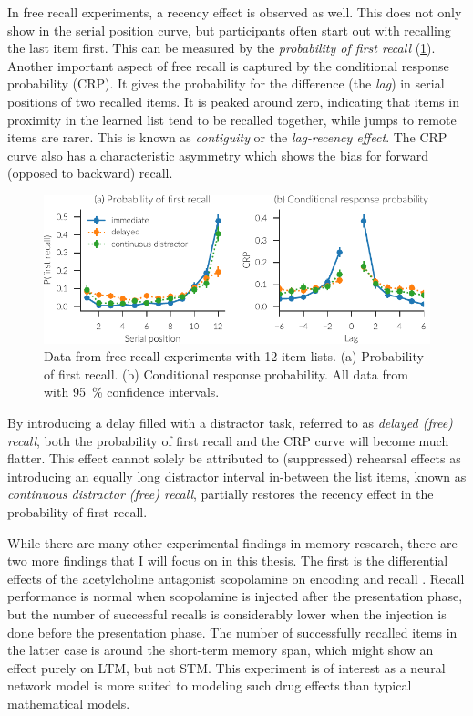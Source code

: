 In free recall experiments, a recency effect is observed as well.
This does not only show in the serial position curve, but participants often start out with recalling the last item first.
This can be measured by the \emph{probability of first recall} (\cref{fig:exp-free-recall}).
Another important aspect of free recall is captured by the conditional response probability (CRP).
It gives the probability for the difference (the \emph{lag}) in serial positions of two recalled items.
It is peaked around zero, indicating that items in proximity in the learned list tend to be recalled together, while jumps to remote items are rarer.
This is known as \emph{contiguity} or the \emph{lag-recency effect}.
The CRP curve also has a characteristic asymmetry which shows the bias for forward (opposed to backward) recall.
\begin{figure}
    \centering
    \includegraphics{figures/exp-free-recall}
    \caption[Free recall probablitiy of first recall and CRP]{Data from free recall experiments with 12 item lists. (a) Probability of first recall. (b) Conditional response probability. All data from \textcite{Howard1999} with \SI{95}{\percent} confidence intervals.}\label{fig:exp-free-recall}
\end{figure}

By introducing a delay filled with a distractor task, referred to as \emph{delayed (free) recall}, both the probability of first recall and the CRP curve will become much flatter.
This effect cannot solely be attributed to (suppressed) rehearsal effects as introducing an equally long distractor interval in-between the list items, known as \emph{continuous distractor (free) recall}, partially restores the recency effect in the probability of first recall.

While there are many other experimental findings in memory research, there are two more findings that I will focus on in this thesis.
The first is the differential effects of the acetylcholine antagonist scopolamine on encoding and recall \parencite{ghoneim1975}.
Recall performance is normal when scopolamine is injected after the presentation phase, but the number of successful recalls is considerably lower when the injection is done before the presentation phase.
The number of successfully recalled items in the latter case is around the short-term memory span, which might show an effect purely on LTM, but not STM\@.
This experiment is of interest as a neural network model is more suited to modeling such drug effects than typical mathematical models.

